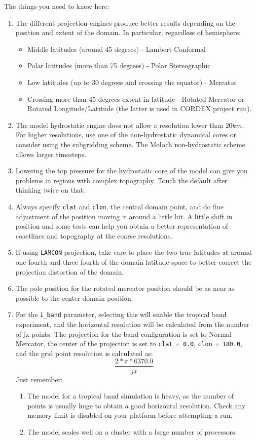 The things you need to know here:

\begin{enumerate}
\item The different projection engines produce better results depending on the
position and extent of the domain. In particular, regardless of hemisphere:
\begin{itemize}
\item Middle latitudes (around 45 degrees) - Lambert Conformal
\item Polar latitudes (more than 75 degrees) - Polar Stereographic
\item Low latitudes (up to 30 degrees and crossing the equator) - Mercator
\item Crossing more than 45 degrees extent in latitude - Rotated Mercator or Rotated Longitude/Latitude (the latter is used in CORDEX project run).
\end{itemize}
\item The model hydrostatic engine does not allow a resolution lower than
$20 km$. For higher resolutions, use one of the non-hydrostatic dynamical cores
or consider using the subgridding scheme. The Moloch non-hydrostatic scheme
allows larger timesteps.
\item Lowering the top pressure for the hydrostatic core of the model can give
you problems in regions with complex topography.
Touch the default after thinking twice on that.
\item Always specify \verb=clat= and \verb=clon=, the central domain point,
and do fine adjustment of the position moving it around a little bit. A
little shift in position and some tests can help you obtain a better
representation of coastlines and topography at the coarse resolutions.
\item If using \verb=LAMCON= projection, take care to place the two
true latitudes at around one fourth and three fourth of the domain latitude
space to better correct the projection distortion of the domain.
\item The pole position for the rotated mercator position should be as near as
possible to the center domain position.
\item For the \verb=i_band= parameter, selecting this will enable the tropical
band experiment, and the horizontal resolution will be calculated from the
number of jx points.
The projection for the band configuration is set to Normal Mercator, the
center of the projection is set to \verb'clat = 0.0', \verb'clon = 180.0',
and the grid point resolution is calculated as:
\begin{equation}
\frac{2*\pi*6370.0}{jx}
\end{equation}
Just remember:
\begin{enumerate}
\item The model for a tropical band simulation is heavy, as the number of points
is usually huge to obtain a good horizontal resolution. Check any memory
limit is disabled on your platform before attempting a run.
\item The model scales well on a cluster with a large number of processors.
\end{enumerate}

\end{enumerate}


